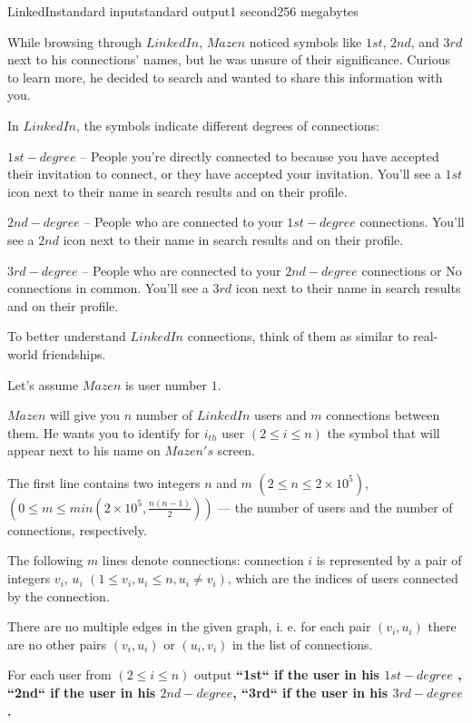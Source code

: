 \begin{problem}{LinkedIn}{standard input}{standard output}{1 second}{256 megabytes}

While browsing through $LinkedIn$, $Mazen$ noticed symbols like $1st$, $2nd$, and $3rd$ next to his connections' names, but he was unsure of their significance. Curious to learn more, he decided to search and wanted to share this information with you.

In $LinkedIn$, the symbols indicate different degrees of connections:

$1st-degree$ -- People you're directly connected to because you have accepted their invitation to connect, or they have accepted your invitation. You'll see a $1st$ icon next to their name in search results and on their profile.

$2nd-degree$ -- People who are connected to your $1st-degree$ connections. You'll see a $2nd$ icon next to their name in search results and on their profile.

$3rd-degree$ -- People who are connected to your $2nd-degree$ connections or No connections in common. You'll see a $3rd$ icon next to their name in search results and on their profile.

To better understand $LinkedIn$ connections, think of them as similar to real-world friendships.

Let's assume $Mazen$ is user number $1$.

$Mazen$ will give you $n$ number of $LinkedIn$ users and $m$ connections between them.
He wants you to identify for $i_{th}$ user $(2 \le i \le n)$ the symbol that will appear next to his name on $Mazen's$ screen.

\InputFile
The first line contains two integers $n$ and $m$ $(2 \le n \le 2\times 10^5)$, $(0 \le m \le min(2 \times 10^5,\frac{n(n−1)}2))$ --- the number of users and the number of connections, respectively.

The following $m$ lines denote connections: connection $i$ is represented by a pair of integers $v_i$, $u_i$ $(1\le v_i,u_i\le n, u_i \neq v_i)$, which are the indices of users connected by the connection.

There are no multiple edges in the given graph, i. e. for each pair $(v_i,u_i)$ there are no other pairs $(v_i,u_i)$ or $(u_i,v_i)$ in the list of connections.

\OutputFile
For each user from $(2 \le i \le n)$ output \bf{``1st``} if the user in his $1st-degree$ , \bf{``2nd``} if the user in his $2nd-degree$, \bf{``3rd``} if the user in his $3rd-degree$.

\Example

\begin{example}
%
\end{example}

\end{problem}


